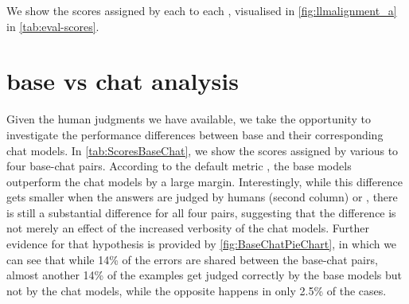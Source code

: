 We show the scores assigned by each \judgemodel to each \evaluatormodel, visualised in \cref{fig:llmalignment_a} in \cref{tab:eval-scores}.





\section{\Evaluatormodel base vs chat analysis}
\label{app:BaseVsChatSupp}

Given the human judgments we have available, we take the opportunity to investigate the performance differences between base and their corresponding chat models.
In \cref{tab:ScoresBaseChat}, we show the scores assigned by various \judgemodels to four base-chat pairs.
According to the default metric , the base models outperform the chat models by a large margin.
Interestingly, while this difference gets smaller when the answers are judged by humans (second column) or , there is still a substantial difference for all four pairs, suggesting that the difference is not merely an effect of the increased verbosity of the chat models.
Further evidence for that hypothesis is provided by \cref{fig:BaseChatPieChart}, in which we can see that while 14\% of the errors are shared between the base-chat pairs, almost another 14\% of the examples get judged correctly by the base models but not by the chat models, while the opposite happens in only 2.5\% of the cases.

